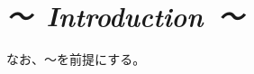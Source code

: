 \documentclass[10pt,a4j,openany,dvipdfmx]{jsarticle}
\begin{document}
\section*{\it {～\ Introduction\ ～}}




なお、〜を前提にする。


\end{document}
